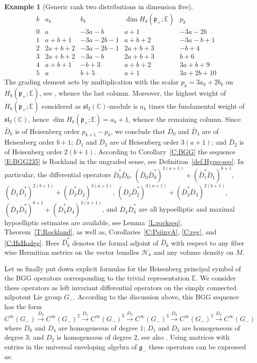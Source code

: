 \documentclass[reqno,12pt]{amsart}
\newcommand\goe{\mathfrak g}
\newcommand\poe{\mathfrak p}
\newcommand\C{\mathbb C}
\theoremstyle{plain}
\theoremstyle{definition}
\newtheorem{example}[theorem]{Example}
\begin{document}
\begin{example}[Generic rank two distributions in dimension five]
\begin{equation}
\begin{array}{r||r|r||r|r}
k & a_k & b_k & \dim H_k(\poe_+;\mathbb E) & p_k
\\\hline\hline
0 & a      & -3a-b    & a+1    & -3a-2b  
\\
1 & a+b+1  & -3a-2b-1 & a+b+2  & -3a-b+1 
\\
2 & 2a+b+2 & -3a-2b-1 & 2a+b+3 & -b+4
\\
3 & 2a+b+2 & -3a-b    & 2a+b+3 & b+6
\\
4 & a+b+1  & -b+3     & a+b+2  & 3a+b+9
\\
5 & a      & b+5      &  a+1   & 3a+2b+10
\end{array}
\end{equation}
The grading element acts by multiplication with the scalar $p_k=3a_k+2b_k$ on $H_k(\poe_+;\mathbb E)$, see \cite[Section~3.2.12]{CS09}, whence the last column.
Moreover, the highest weight of $H_k(\poe_+;\mathbb E)$ considered as $\mathfrak s\mathfrak l_2(\C)$-module is $a_k$ times the fundamental weight of $\mathfrak s\mathfrak l_2(\C)$, hence $\dim H_k(\poe_+;\mathbb E)=a_k+1$, whence the remaining column.
Since $\bar D_k$ is of Heisenberg order $p_{k+1}-p_k$, we conclude that $\bar D_0$ and $\bar D_4$ are of Heisenberg order $b+1$; $\bar D_1$ and $\bar D_3$ are of Heisenberg order $3(a+1)$; and $\bar D_2$ is of Heisenberg order $2(b+1)$.
According to Corollary~\ref{C:BGG} the sequence \eqref{E:BGG235} is Rockland in the ungraded sense, see Definition~\ref{def.Hypo-seq}.
In particular, the differential operators
$\bar D_0^*\bar D_0$, 
$(\bar D_0\bar D_0^*)^{3(a+1)}+(\bar D_1^*\bar D_1)^{b+1}$, 
$(\bar D_1\bar D_1^*)^{2(b+1)}+(\bar D_2^*\bar D_2)^{3(a+1)}$,
$(\bar D_2\bar D_2^*)^{3(a+1)}+(\bar D_3^*\bar D_3)^{2(b+1)}$,
$(\bar D_3\bar D_3^*)^{b+1}+(\bar D_4^*\bar D_4)^{3(a+1)}$, and
$\bar D_4\bar D_4^*$ 
are all hypoelliptic and maximal hypoelliptic estimates are available, see Lemma~\ref{L:rockseq}, Theorem~\ref{T:Rockland}, as well as, Corollaries~\ref{C:PsiinvA}, \ref{C:reg}, and \ref{C:HsHodge}.
Here $\bar D_k^*$ denotes the formal adjoint of $\bar D_k$ with respect to any fiber wise Hermitian metrics on the vector bundles $\mathcal H_k$ and any volume density on $M$.


Let us finally put down explicit formulas for the Heisenberg principal symbol of the BGG operators corresponding to the trivial representation $\mathbb E$.
We consider these operators as left invariant differential operators on the simply connected nilpotent Lie group $G_-$.
According to the discussion above, this  BGG sequence has the form
\begin{equation}\label{E:BGG235dR}
C^\infty(G_-)\xrightarrow{D_0}
C^\infty(G_-)^2\xrightarrow{D_1}
C^\infty(G_-)^3\xrightarrow{D_2}
C^\infty(G_-)^3\xrightarrow{D_3}
C^\infty(G_-)^2\xrightarrow{D_4}
C^\infty(G_-)
\end{equation}
where $D_0$ and $D_4$ are homogeneous of degree $1$; $D_1$ and $D_3$ are homogeneous of degree $3$; and $D_2$ is homogeneous of degree $2$, see also \cite{BENG12}.
Using matrices with entries in the universal enveloping algebra of $\goe_-$ these operators can be expressed as:


\end{example}
\end{document}
